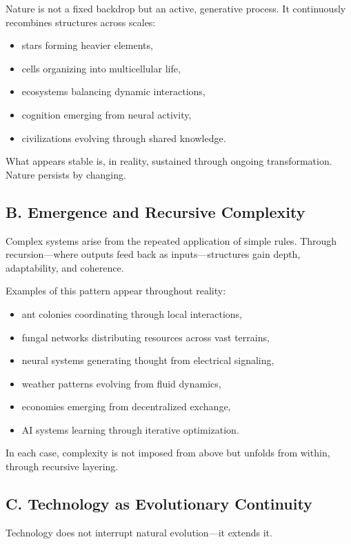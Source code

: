 \documentclass[12pt]{article}
\begin{document}
Nature is not a fixed backdrop but an active, generative process. It continuously recombines structures across scales:
\begin{itemize}
    \item stars forming heavier elements,
    \item cells organizing into multicellular life,
    \item ecosystems balancing dynamic interactions,
    \item cognition emerging from neural activity,
    \item civilizations evolving through shared knowledge.
\end{itemize}

What appears stable is, in reality, sustained through ongoing transformation. Nature persists by changing.

\subsection*{B. Emergence and Recursive Complexity}

Complex systems arise from the repeated application of simple rules. Through recursion—where outputs feed back as inputs—structures gain depth, adaptability, and coherence.

Examples of this pattern appear throughout reality:
\begin{itemize}
    \item ant colonies coordinating through local interactions,
    \item fungal networks distributing resources across vast terrains,
    \item neural systems generating thought from electrical signaling,
    \item weather patterns evolving from fluid dynamics,
    \item economies emerging from decentralized exchange,
    \item AI systems learning through iterative optimization.
\end{itemize}

In each case, complexity is not imposed from above but unfolds from within, through recursive layering.

\subsection*{C. Technology as Evolutionary Continuity}

Technology does not interrupt natural evolution—it extends it.
\end{document}
